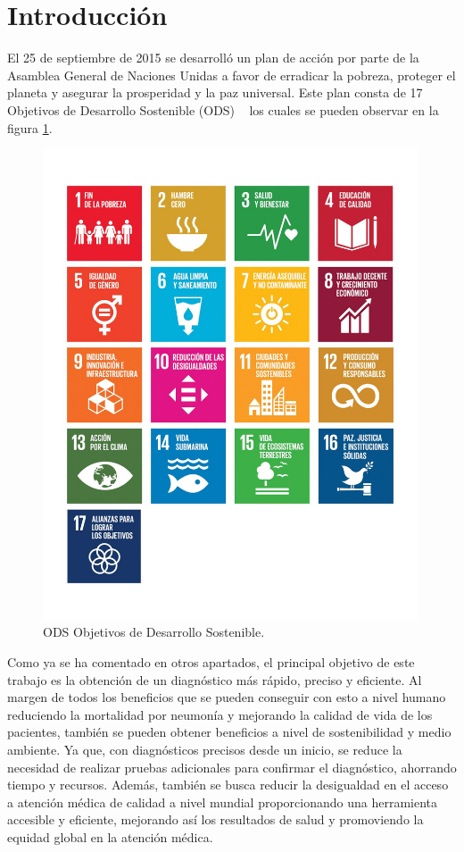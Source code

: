 
\section{Introducción}

El 25 de septiembre de 2015 se desarrolló un plan de acción por parte de la Asamblea General de Naciones Unidas a favor de erradicar la pobreza, proteger el planeta y asegurar la prosperidad y la paz universal. Este plan consta de 17 Objetivos de Desarrollo Sostenible (ODS) ~\cite{PaMuReEs24} los cuales se pueden observar en la figura \ref{fig:ODS}.

\begin{figure}[h]
    \centering
    \includegraphics[width=0.99\textwidth]{img/ODS.jpg}
    \caption{ODS Objetivos de Desarrollo Sostenible.~\cite{openbank24} }
    \label{fig:ODS}
\end{figure}
\FloatBarrier

Como ya se ha comentado en otros apartados, el principal objetivo de este trabajo es la obtención de un diagnóstico más rápido, preciso y eficiente. Al margen de todos los beneficios que se pueden conseguir con esto a nivel humano reduciendo la mortalidad por neumonía y mejorando la calidad de vida de los pacientes, también se pueden obtener beneficios a nivel de sostenibilidad y medio ambiente. Ya que, con diagnósticos precisos desde un inicio, se reduce la necesidad de realizar pruebas adicionales para confirmar el diagnóstico, ahorrando tiempo y recursos. Además, también se busca reducir la desigualdad en el acceso a atención médica de calidad a nivel mundial proporcionando una herramienta accesible y eficiente, mejorando así los resultados de salud y promoviendo la equidad global en la atención médica.

